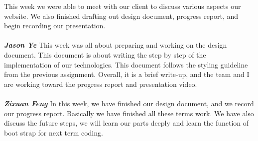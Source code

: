 \documentclass[onecolumn, draftclsnofoot,10pt, compsoc]{IEEEtran}
\begin{document}
This week we were able to meet with our client to discuss various aspects our website. We also finished drafting out design document, progress report, and begin recording our presentation.\\ \\
\textbf{\textit{Jason Ye}}
This week was all about preparing and working on the design document. This document is about writing the step by step of the implementation of our technologies. This document follows the styling guideline from the previous assignment. Overall, it is a brief write-up, and the team and I are working toward the progress report and presentation video.\\ \\
\textbf{\textit{Zixuan Feng}}
In this week, we have finished our design document, and we record our progress report. Basically we have finished all these terms work. We have also discuss the future steps, we will learn our parts deeply and learn the function of boot strap for next term coding.\\ \\
\end{document}
